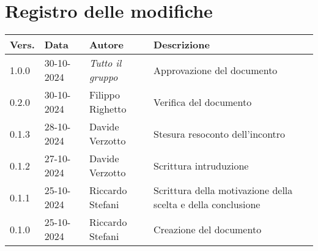 \section*{Registro delle modifiche}

\begin{table}[h]
    \centering
    \begin{tabular}{|l|l|l|p{5cm}|}
        \hline
        \rowcolor[gray]{0.9}
        \textbf{Vers.} & \textbf{Data} & \textbf{Autore} & \textbf{Descrizione}\\
        \hline
        1.0.0 & 30-10-2024 & \emph{Tutto il gruppo} & Approvazione del documento\\
        \hline
        0.2.0 & 30-10-2024 & Filippo Righetto & Verifica del documento\\
        \hline
        0.1.3 & 28-10-2024 & Davide Verzotto & Stesura resoconto dell'incontro\\
        \hline
        0.1.2 & 27-10-2024 & Davide Verzotto & Scrittura intruduzione\\
        \hline
        0.1.1 & 25-10-2024 & Riccardo Stefani & Scrittura della motivazione della scelta e della conclusione\\
        \hline
        0.1.0 & 25-10-2024 & Riccardo Stefani & Creazione del documento\\
        \hline
    \end{tabular}
\end{table}

